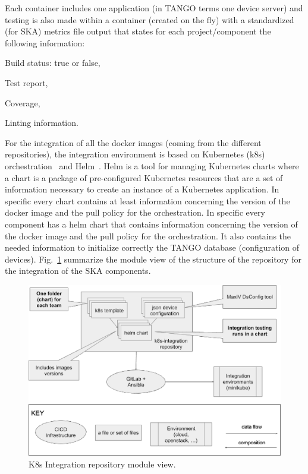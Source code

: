 \documentclass[a4paper,
               keeplastbox,   %
               ]{jacow}
\begin{document}
Each container includes one application (in TANGO terms one device server) and testing is also made within a container (created on the fly) with a standardized (for SKA) metrics file output that states for each project/component the following information: 
\begin{Itemize}
    \item Build status: true or false,
    \item Test report,
    \item Coverage,
    \item Linting information.
\end{Itemize}
For the integration of all the docker images (coming from the different repositories), the integration environment is based on Kubernetes (k8s) orchestration~\cite{kubernetes} and Helm~\cite{helm}. Helm is a tool for managing Kubernetes charts where a chart is a package of pre-configured Kubernetes resources that are a set of information necessary to create an instance of a Kubernetes application. In specific every chart contains at least information concerning the version of the docker image and the pull policy for the orchestration. In specific every component has a helm chart that contains information concerning the version of the docker image and the pull policy for the orchestration. It also contains the needed information to initialize correctly the TANGO database (configuration of devices). Fig.~\ref{fig:k8sIntegrationRepo} summarize the module view of the structure of the repository for the integration of the SKA components. 
\begin{figure}[!htb]
   \centering
   \includegraphics*[width=1\columnwidth]{k8sIntegrationRepo}
   \caption{K8s Integration repository module view.}
   \label{fig:k8sIntegrationRepo}
\end{figure}
\end{document}
